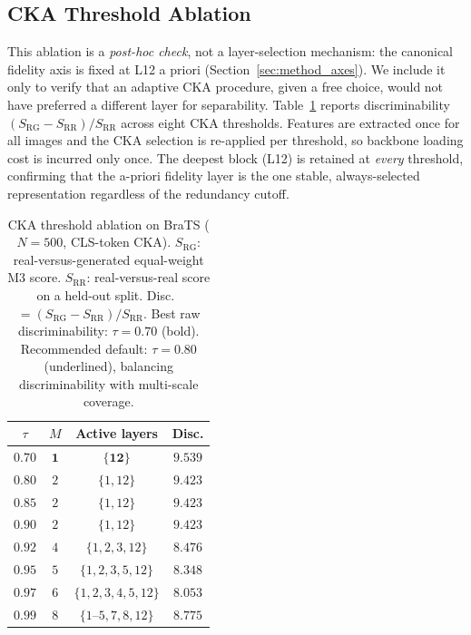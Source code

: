 \documentclass[lettersize,journal]{IEEEtran}
\begin{document}
\subsection{CKA Threshold Ablation}
\label{sec:results_ablation}

This ablation is a \emph{post-hoc check}, not a layer-selection mechanism:
the canonical fidelity axis is fixed at L12 a priori
(Section~\ref{sec:method_axes}). We include it only to verify that an
adaptive CKA procedure, given a free choice, would not have preferred a
different layer for separability.
Table~\ref{tab:cka_ablation} reports discriminability
$(S_\text{RG} - S_\text{RR}) / S_\text{RR}$ across eight CKA
thresholds.
Features are extracted once for all images and the CKA selection is
re-applied per threshold, so backbone loading cost is incurred only once.
The deepest block (L12) is retained at \emph{every} threshold, confirming
that the a-priori fidelity layer is the one stable, always-selected
representation regardless of the redundancy cutoff.

\begin{table}[t]
\centering
\caption{%
  CKA threshold ablation on BraTS ($N = 500$, CLS-token CKA).
  $S_\text{RG}$: real-versus-generated equal-weight M3 score.
  $S_\text{RR}$: real-versus-real score on a held-out split.
  Disc.\ $= (S_\text{RG} - S_\text{RR})/S_\text{RR}$.
  Best raw discriminability: $\tau = 0.70$ (bold).
  Recommended default: $\tau = 0.80$ (underlined), balancing discriminability with
  multi-scale coverage.
}
\label{tab:cka_ablation}
\setlength{\tabcolsep}{5pt}
\begin{tabular}{cccc}
\toprule
$\tau$ & $M$ & Active layers & Disc. \\
\midrule
$\mathbf{0.70}$ & $\mathbf{1}$  & $\mathbf{\{12\}}$                  & $\mathbf{9.539}$ \\
$0.80$ & $2$ & $\{1, 12\}$        & $9.423$ \\
$0.85$ & $2$ & $\{1, 12\}$        & $9.423$ \\
$0.90$ & $2$ & $\{1, 12\}$        & $9.423$ \\
$0.92$ & $4$ & $\{1, 2, 3, 12\}$  & $8.476$ \\
$0.95$ & $5$ & $\{1, 2, 3, 5, 12\}$ & $8.348$ \\
$0.97$ & $6$ & $\{1, 2, 3, 4, 5, 12\}$ & $8.053$ \\
$0.99$ & $8$ & $\{1\text{--}5, 7, 8, 12\}$ & $8.775$ \\
\bottomrule
\end{tabular}
\end{table}
\end{document}
